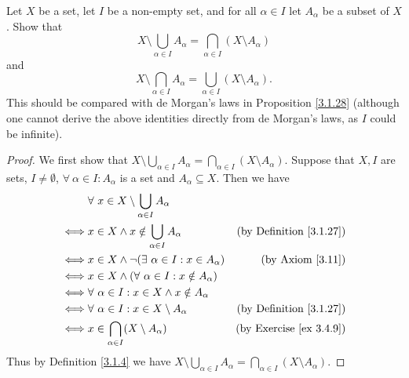 \begin{exercise}\label{ex 3.4.11}
Let \(X\) be a set, let \(I\) be a non-empty set, and for all \(\alpha \in I\) let \(A_{\alpha}\) be a subset of \(X\).
Show that
\[
    X \setminus \bigcup_{\alpha \in I} A_{\alpha} = \bigcap_{\alpha \in I} (X \setminus A_{\alpha})
\]
and
\[
    X \setminus \bigcap_{\alpha \in I} A_{\alpha} = \bigcup_{\alpha \in I} (X \setminus A_{\alpha}).
\]
This should be compared with de Morgan’s laws in Proposition \ref{3.1.28}
(although one cannot derive the above identities directly from de Morgan’s laws, as \(I\) could be infinite).
\end{exercise}

\begin{proof}
We first show that \(X \setminus \bigcup_{\alpha \in I} A_{\alpha} = \bigcap_{\alpha \in I} (X \setminus A_{\alpha})\).
Suppose that \(X, I\) are sets, \(I \neq \emptyset\), \(\forall\ \alpha \in I : A_{\alpha}\) is a set and \(A_{\alpha} \subseteq X\).
Then we have
\begin{align*}
& \forall\ x \in X \setminus \bigcup_{\alpha \in I} A_{\alpha} \\
\iff & x \in X \land x \notin \bigcup_{\alpha \in I} A_{\alpha} & \text{(by Definition \ref{3.1.27})} \\
\iff & x \in X \land \lnot(\exists\ \alpha \in I : x \in A_{\alpha}) & \text{(by Axiom \ref{3.11})} \\
\iff & x \in X \land (\forall\ \alpha \in I : x \notin A_{\alpha}) \\
\iff & \forall\ \alpha \in I : x \in X \land x \notin A_{\alpha} \\
\iff & \forall\ \alpha \in I : x \in X \setminus A_{\alpha} & \text{(by Definition \ref{3.1.27})} \\
\iff & x \in \bigcap_{\alpha \in I} (X \setminus A_{\alpha}) & \text{(by Exercise \ref{ex 3.4.9})} \\
\end{align*}
Thus by Definition \ref{3.1.4} we have \(X \setminus \bigcup_{\alpha \in I} A_{\alpha} = \bigcap_{\alpha \in I} (X \setminus A_{\alpha})\).


\end{proof}

